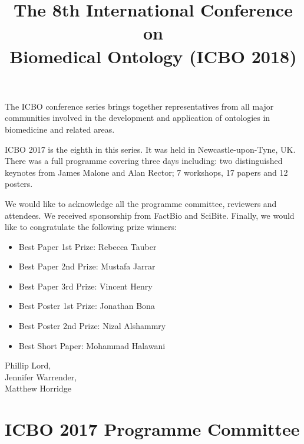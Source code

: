 \documentclass{article}
\title{The 8th International Conference on\\Biomedical Ontology (ICBO 2018)}
\date{}
\begin{document}
\parindent0pt
\parskip15pt
\maketitle

The ICBO conference series brings together representatives from all
major communities involved in the development and application of
ontologies in biomedicine and related areas.

ICBO 2017 is the eighth in this series. It was held in
Newcastle-upon-Tyne, UK. There was a full programme covering three
days including: two distinguished keynotes from James Malone and Alan
Rector; 7 workshops, 17 papers and 12 posters.

We would like to acknowledge all the programme committee, reviewers and
attendees. We received sponsorship from FactBio and SciBite. Finally, we would like to congratulate the following prize winners:

\begin{itemize}
\item Best Paper 1st Prize: Rebecca Tauber
\item Best Paper 2nd Prize: Mustafa Jarrar
\item Best Paper 3rd Prize: Vincent Henry
\item Best Poster 1st Prize: Jonathan Bona
\item Best Poster 2nd Prize: Nizal Alshammry
\item Best Short Paper: Mohammad Halawani
\end{itemize}

Phillip Lord,\\
Jennifer Warrender,\\
Matthew Horridge


\section*{ICBO 2017 Programme Committee}
\end{document}
